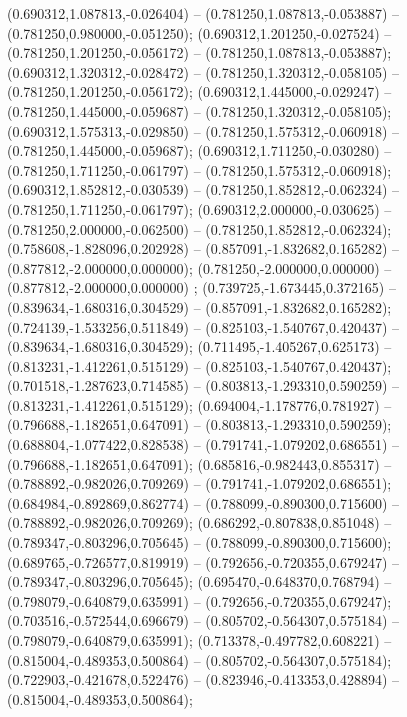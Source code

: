  (0.690312,1.087813,-0.026404) -- (0.781250,1.087813,-0.053887) -- (0.781250,0.980000,-0.051250);
 (0.690312,1.201250,-0.027524) -- (0.781250,1.201250,-0.056172) -- (0.781250,1.087813,-0.053887);
 (0.690312,1.320312,-0.028472) -- (0.781250,1.320312,-0.058105) -- (0.781250,1.201250,-0.056172);
 (0.690312,1.445000,-0.029247) -- (0.781250,1.445000,-0.059687) -- (0.781250,1.320312,-0.058105);
 (0.690312,1.575313,-0.029850) -- (0.781250,1.575312,-0.060918) -- (0.781250,1.445000,-0.059687);
 (0.690312,1.711250,-0.030280) -- (0.781250,1.711250,-0.061797) -- (0.781250,1.575312,-0.060918);
 (0.690312,1.852812,-0.030539) -- (0.781250,1.852812,-0.062324) -- (0.781250,1.711250,-0.061797);
 (0.690312,2.000000,-0.030625) -- (0.781250,2.000000,-0.062500) -- (0.781250,1.852812,-0.062324);
 (0.758608,-1.828096,0.202928) -- (0.857091,-1.832682,0.165282) -- (0.877812,-2.000000,0.000000);
 (0.781250,-2.000000,0.000000) -- (0.877812,-2.000000,0.000000) ;
 (0.739725,-1.673445,0.372165) -- (0.839634,-1.680316,0.304529) -- (0.857091,-1.832682,0.165282);
 (0.724139,-1.533256,0.511849) -- (0.825103,-1.540767,0.420437) -- (0.839634,-1.680316,0.304529);
 (0.711495,-1.405267,0.625173) -- (0.813231,-1.412261,0.515129) -- (0.825103,-1.540767,0.420437);
 (0.701518,-1.287623,0.714585) -- (0.803813,-1.293310,0.590259) -- (0.813231,-1.412261,0.515129);
 (0.694004,-1.178776,0.781927) -- (0.796688,-1.182651,0.647091) -- (0.803813,-1.293310,0.590259);
 (0.688804,-1.077422,0.828538) -- (0.791741,-1.079202,0.686551) -- (0.796688,-1.182651,0.647091);
 (0.685816,-0.982443,0.855317) -- (0.788892,-0.982026,0.709269) -- (0.791741,-1.079202,0.686551);
 (0.684984,-0.892869,0.862774) -- (0.788099,-0.890300,0.715600) -- (0.788892,-0.982026,0.709269);
 (0.686292,-0.807838,0.851048) -- (0.789347,-0.803296,0.705645) -- (0.788099,-0.890300,0.715600);
 (0.689765,-0.726577,0.819919) -- (0.792656,-0.720355,0.679247) -- (0.789347,-0.803296,0.705645);
 (0.695470,-0.648370,0.768794) -- (0.798079,-0.640879,0.635991) -- (0.792656,-0.720355,0.679247);
 (0.703516,-0.572544,0.696679) -- (0.805702,-0.564307,0.575184) -- (0.798079,-0.640879,0.635991);
 (0.713378,-0.497782,0.608221) -- (0.815004,-0.489353,0.500864) -- (0.805702,-0.564307,0.575184);
 (0.722903,-0.421678,0.522476) -- (0.823946,-0.413353,0.428894) -- (0.815004,-0.489353,0.500864);
